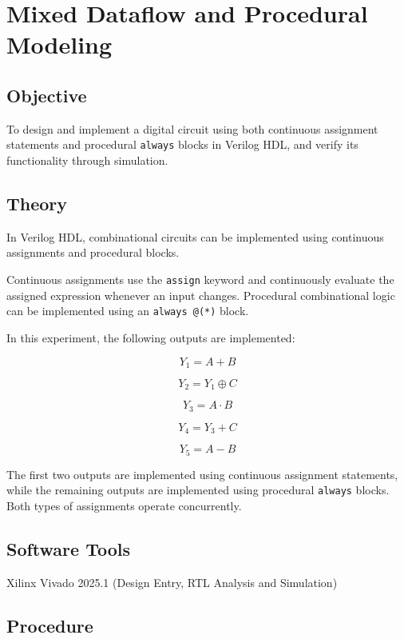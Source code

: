 \documentclass[12pt,a4paper]{report}
\begin{document}
\vspace{2.5cm}
\chapter{Mixed Dataflow and Procedural Modeling}
\label{ch:pdf9}

\section{Objective}

To design and implement a digital circuit using both continuous assignment statements and procedural \texttt{always} blocks in Verilog HDL, and verify its functionality through simulation.

\section{Theory}

In Verilog HDL, combinational circuits can be implemented using continuous assignments and procedural blocks.

Continuous assignments use the \texttt{assign} keyword and continuously evaluate the assigned expression whenever an input changes. Procedural combinational logic can be implemented using an \texttt{always @(*)} block.

In this experiment, the following outputs are implemented:

\[
Y_1 = A + B
\]

\[
Y_2 = Y_1 \oplus C
\]

\[
Y_3 = A \cdot B
\]

\[
Y_4 = Y_3 + C
\]

\[
Y_5 = A - B
\]

The first two outputs are implemented using continuous assignment statements, while the remaining outputs are implemented using procedural \texttt{always} blocks. Both types of assignments operate concurrently.


\section{Software Tools}

Xilinx Vivado 2025.1 (Design Entry, RTL Analysis and Simulation)

\section{Procedure}
\end{document}
